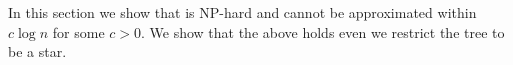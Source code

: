 In this section we show that \Prob{} is NP-hard and cannot be approximated
within $c\log n$ for some $c > 0$.
We show that the above holds even we restrict the tree to be a star.

\begin{figure}
\begin{center}

\end{center}
\end{figure} 